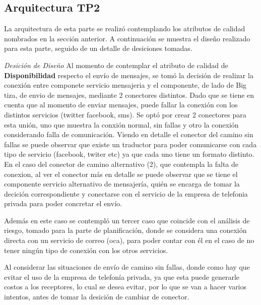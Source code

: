 \documentclass[a4paper, 11pt]{article}
\begin{document}
\subsection{Arquitectura TP2}
La arquitectura de esta parte se realizó contemplando los atributos de calidad nombrados en la sección anterior. A continuación se muestra el diseño realizado para esta parte, seguido de un detalle de desiciones tomadas.

\emph{Desición de Diseño} Al momento de contemplar el atributo de calidad de \textbf{Disponibilidad} respecto el envío de mensajes, se tomó la decisión de realizar la conexión entre componete servicio mensajeria  y el componente, de lado de Big tiza, de envio de mensajes, mediante 2 conectores distintos. Dado que se tiene en cuenta que al momento  de enviar mensajes, puede fallar la conexión con los distintos servicios (twitter facebook, sms). 
Se optó por crear 2 conectores para esta unión, uno que muestra la conxión normal, sin fallas y otro la conexión considerando falla de comunicación. 
Viendo en detalle el conector del camino sin fallas se puede observar que existe un traductor para poder comunicarse con cada tipo de servicio (facebook, twiter etc) ya que cada uno tiene un formato distinto.
En el caso del conector de camino alternativo (2), que contempla la falta de conexion, al ver el conector más en detalle se puede observar  que se tiene el componente servicio alternativo de mensajería, quién se encarga de tomar la decición correspondiente y conectarse con el servicio de la empresa de telefonia privada para poder concretar el envío.

Además en este caso se contempló un tercer caso que coincide con el análisis de riesgo, tomado para la parte de planificación, donde se considera una conexión directa con un servicio de correo (oca), para poder contar con él en el caso de no tener ningún tipo de conexión con los otros servicios. %

Al considerar las situaciones de envío de camino sin fallas, donde como hay que evitar el uso de la empresa de telefonía privada, ya que esta puede generarle costos a los receptores, lo cual se desea evitar, por lo que se van a hacer varios intentos, antes de tomar la desición de cambiar de conector.

\end{document}
